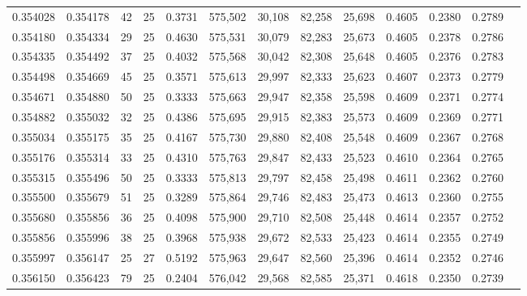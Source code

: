 \begin{tabular}{rrrrrrrrrrrrr}
0.354028 & 0.354178 &    42 &  25 &                                     0.3731 & 575,502 &  30,108 &  82,258 &  25,698 & 0.4605 & 0.2380 & 0.2789 \\
0.354180 & 0.354334 &    29 &  25 &                                     0.4630 & 575,531 &  30,079 &  82,283 &  25,673 & 0.4605 & 0.2378 & 0.2786 \\
0.354335 & 0.354492 &    37 &  25 &                                     0.4032 & 575,568 &  30,042 &  82,308 &  25,648 & 0.4605 & 0.2376 & 0.2783 \\
0.354498 & 0.354669 &    45 &  25 &                                     0.3571 & 575,613 &  29,997 &  82,333 &  25,623 & 0.4607 & 0.2373 & 0.2779 \\
0.354671 & 0.354880 &    50 &  25 &                                     0.3333 & 575,663 &  29,947 &  82,358 &  25,598 & 0.4609 & 0.2371 & 0.2774 \\
0.354882 & 0.355032 &    32 &  25 &                                     0.4386 & 575,695 &  29,915 &  82,383 &  25,573 & 0.4609 & 0.2369 & 0.2771 \\
0.355034 & 0.355175 &    35 &  25 &                                     0.4167 & 575,730 &  29,880 &  82,408 &  25,548 & 0.4609 & 0.2367 & 0.2768 \\
0.355176 & 0.355314 &    33 &  25 &                                     0.4310 & 575,763 &  29,847 &  82,433 &  25,523 & 0.4610 & 0.2364 & 0.2765 \\
0.355315 & 0.355496 &    50 &  25 &                                     0.3333 & 575,813 &  29,797 &  82,458 &  25,498 & 0.4611 & 0.2362 & 0.2760 \\
0.355500 & 0.355679 &    51 &  25 &                                     0.3289 & 575,864 &  29,746 &  82,483 &  25,473 & 0.4613 & 0.2360 & 0.2755 \\
0.355680 & 0.355856 &    36 &  25 &                                     0.4098 & 575,900 &  29,710 &  82,508 &  25,448 & 0.4614 & 0.2357 & 0.2752 \\
0.355856 & 0.355996 &    38 &  25 &                                     0.3968 & 575,938 &  29,672 &  82,533 &  25,423 & 0.4614 & 0.2355 & 0.2749 \\
0.355997 & 0.356147 &    25 &  27 &                                     0.5192 & 575,963 &  29,647 &  82,560 &  25,396 & 0.4614 & 0.2352 & 0.2746 \\
0.356150 & 0.356423 &    79 &  25 &                                     0.2404 & 576,042 &  29,568 &  82,585 &  25,371 & 0.4618 & 0.2350 & 0.2739 \\

\end{tabular}
